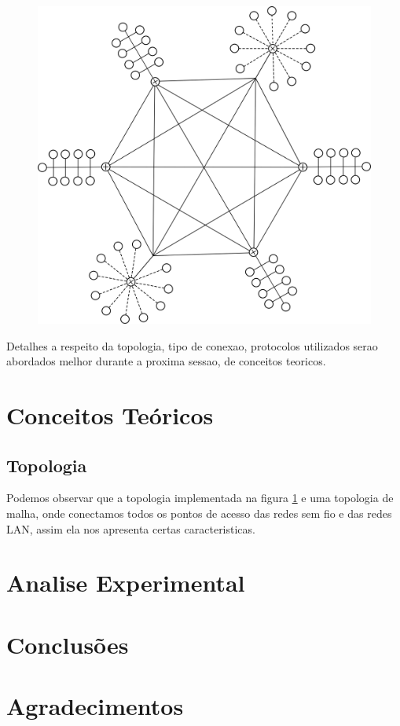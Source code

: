 \documentclass[conference]{IEEEtran}
\begin{document}
	\begin{figure}[h]
		\centering
		\includegraphics[scale=0.45]{./images/topologia}
		\caption{}
		\label{fig:topologia}
	\end{figure}

	Detalhes a respeito da  topologia, tipo de conexao, protocolos utilizados serao abordados melhor durante a proxima sessao, de conceitos teoricos. 

\section{Conceitos Teóricos}

	\subsection{\textbf{Topologia}}
		Podemos observar que a topologia implementada na figura \ref{fig:topologia} e uma topologia de malha, onde conectamos todos os pontos de acesso das redes sem fio e das redes LAN, assim ela nos apresenta certas caracteristicas.

\section{Analise Experimental}

\section{Conclusões}



\section*{Agradecimentos}


\end{document}
